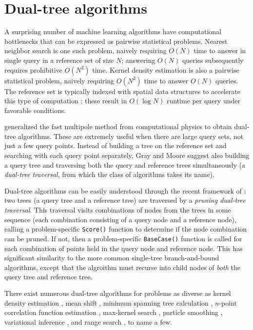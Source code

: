 \documentclass[twoside,11pt]{article} %
\begin{document}
\section{Dual-tree algorithms}

A surprising number of machine learning algorithms have computational
bottlenecks that can be expressed as pairwise statistical problems.
Nearest neighbor search is one such problem, naively requiring $O(N)$ time
to answer in single query in a reference set of size $N$; answering $O(N)$
queries subsequently requires prohibitive $O(N^2)$ time. Kernel density
estimation is also a pairwise statistical problem, naively requiring $O(N^2)$
time to answer $O(N)$ queries. The reference set is typically indexed with
spatial data structures to accelerate this type of computation
\citep{finkel1974quad, langford2006}; these result in $O(\log N)$ runtime per
query under favorable conditions.

\citet{nbody} generalized the fast multipole method from
computational physics to obtain dual-tree algorithms.  These are extremely
useful when there are large query sets, not just a few query points.  Instead of
building a tree on the reference set and searching with each query point
separately, Gray and Moore suggest also building a query tree and traversing
both the query and reference trees simultaneously (a {\it dual-tree traversal},
from which the class of algorithms takes its name).

Dual-tree algorithms can be easily understood through the recent framework of
\citet{curtin2013tree}: two trees (a query tree and a reference
tree) are traversed by a {\it pruning dual-tree traversal}.  This traversal
visits combinations of nodes from the trees in some sequence (each combination
consisting of a query node and a reference node), calling a problem-specific
\texttt{Score()} function to determine if the node combination can be pruned.
If not, then a problem-specific \texttt{BaseCase()} function is called for each
combination of points held in the query node and reference node.  This has
significant similarity to the more common single-tree branch-and-bound
algorithms, except that the algroithm must recurse into child nodes of {\it
both} the query tree and reference tree.

There exist numerous dual-tree algorithms for problems as diverse as kernel
density estimation \citep{gray2003nonparametric}, mean shift \citep{wang2007fast},
minimum spanning tree calculation \citep{march2010euclidean}, $n$-point
correlation function estimation \citep{march2012fast}, max-kernel search
\citep{curtin2013fast}, particle smoothing \citep{klaas2006fast}, variational
inference \citep{amizadeh2012variational}, and range search \citep{nbody}, to name
a few.
\end{document}
